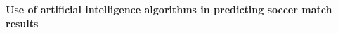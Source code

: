 \begin{center}
\textbf{Use of artificial intelligence algorithms in predicting soccer match results\\}
\end{center}